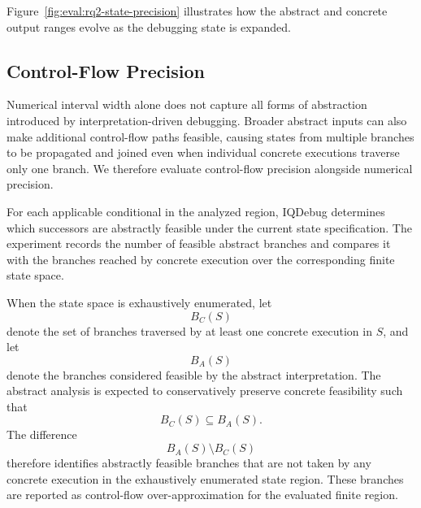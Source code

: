 \documentclass[11pt,oneside]{report}
\theoremstyle{plain}
\theoremstyle{definition}
\theoremstyle{remark}
\begin{document}
Figure~\ref{fig:eval:rq2-state-precision} illustrates how the abstract and concrete output ranges evolve as the debugging state is expanded.



\subsection{Control-Flow Precision}
\label{subsec:eval:rq2:controlflow}

Numerical interval width alone does not capture all forms of abstraction introduced by interpretation-driven debugging. Broader abstract inputs can also make additional control-flow paths feasible, causing states from multiple branches to be propagated and joined even when individual concrete executions traverse only one branch. We therefore evaluate control-flow precision alongside numerical precision.

For each applicable conditional in the analyzed region, IQDebug determines which successors are abstractly feasible under the current state specification. The experiment records the number of feasible abstract branches and compares it with the branches reached by concrete execution over the corresponding finite state space.

When the state space is exhaustively enumerated, let
\[
B_C(S)
\]
denote the set of branches traversed by at least one concrete execution in \(S\), and let
\[
B_A(S)
\]
denote the branches considered feasible by the abstract interpretation. The abstract analysis is expected to conservatively preserve concrete feasibility such that
\[
B_C(S)
\subseteq
B_A(S).
\]
The difference
\[
B_A(S)\setminus B_C(S)
\]
therefore identifies abstractly feasible branches that are not taken by any concrete execution in the exhaustively enumerated state region. These branches are reported as control-flow over-approximation for the evaluated finite region.
\end{document}
